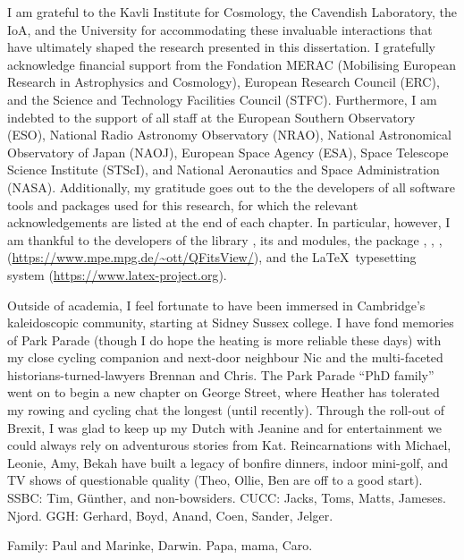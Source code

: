 \begin{acknowledgements}
    I am grateful to the Kavli Institute for Cosmology, the Cavendish Laboratory, the IoA, and the University for accommodating these invaluable interactions that have ultimately shaped the research presented in this dissertation. I gratefully acknowledge financial support from the Fondation MERAC (Mobilising European Research in Astrophysics and Cosmology), European Research Council (ERC), and the Science and Technology Facilities Council (STFC). Furthermore, I am indebted to the support of all staff at the European Southern Observatory (ESO), National Radio Astronomy Observatory (NRAO), National Astronomical Observatory of Japan (NAOJ), European Space Agency (ESA), Space Telescope Science Institute (STScI), and National Aeronautics and Space Administration (NASA). Additionally, my gratitude goes out to the the developers of all software tools and packages used for this research, for which the relevant acknowledgements are listed at the end of each chapter. In particular, however, I am thankful to the developers of the  library \citep{Jones2001}, its  \citep{2011CSE....13b..22V} and  \citep{Hunter2007} modules, the  package \citep{2013A&A...558A..33A, 2018AJ....156..123A},  \citep{2003ASPC..295..489J},  \citep[Tool for OPerations on Catalogues And Tables;][]{2005ASPC..347...29T},  (\url{https://www.mpe.mpg.de/~ott/QFitsView/}), and the \LaTeX\ typesetting system (\url{https://www.latex-project.org}).
    
    Outside of academia, I feel fortunate to have been immersed in Cambridge's kaleidoscopic community, starting at Sidney Sussex college. I have fond memories of Park Parade (though I do hope the heating is more reliable these days) with my close cycling companion and next-door neighbour Nic and the multi-faceted historians-turned-lawyers Brennan and Chris. The Park Parade ``PhD family'' went on to begin a new chapter on George Street, where Heather has tolerated my rowing and cycling chat the longest (until recently). Through the roll-out of Brexit, I was glad to keep up my Dutch with Jeanine and for entertainment we could always rely on adventurous stories from Kat. Reincarnations with Michael, Leonie, Amy, Bekah have built a legacy of bonfire dinners, indoor mini-golf, and TV shows of questionable quality (Theo, Ollie, Ben are off to a good start). SSBC: Tim, G{\"u}nther, and non-bowsiders. CUCC: Jacks, Toms, Matts, Jameses. Njord. GGH: Gerhard, Boyd, Anand, Coen, Sander, Jelger.
    
    Family: Paul and Marinke, Darwin. Papa, mama, Caro.
    
\end{acknowledgements}
